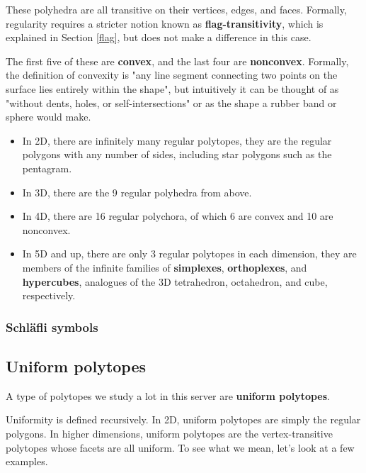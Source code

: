 \documentclass{article}
\begin{document}
These polyhedra are all transitive on their vertices, edges, and faces. Formally, regularity
requires a stricter notion known as \textbf{flag-transitivity}, which is explained in Section
\ref{flag}, but does not make a difference in this case.

The first five of these are \textbf{convex}, and the last four are \textbf{nonconvex}. Formally,
the definition of convexity is "any line segment connecting two points on the surface lies
entirely within the shape", but intuitively it can be thought of as "without dents, holes, or
self-intersections" or as the shape a rubber band or sphere would make.

\begin{itemize}
\item In 2D, there are infinitely many regular polytopes, they are the regular polygons with any
number of sides, including star polygons such as the pentagram.
\item In 3D, there are the 9 regular polyhedra from above.
\item In 4D, there are 16 regular polychora, of which 6 are convex and 10 are nonconvex.
\item In 5D and up, there are only 3 regular polytopes in each dimension, they are members of
the infinite families of \textbf{simplexes}, \textbf{orthoplexes}, and \textbf{hypercubes},
analogues of the 3D tetrahedron, octahedron, and cube, respectively.
\end{itemize}

\subsubsection{Schläfli symbols}

\subsection{Uniform polytopes}
A type of polytopes we study a lot in this server are \textbf{uniform polytopes}.

Uniformity is defined recursively. In 2D, uniform polytopes are simply the regular polygons.
In higher dimensions, uniform polytopes are the vertex-transitive polytopes whose facets are
all uniform. To see what we mean, let's look at a few examples.
\end{document}
